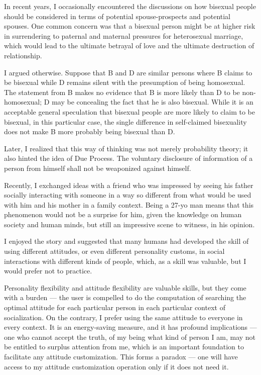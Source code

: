 
\begin{multicols*}{2}
	In recent years, I occasionally encountered the discussions on how bisexual people should be considered
	in terms of potential spouse-prospects and potential spouses.
	One common concern was that a bisexual person might be at higher risk in
	surrendering to paternal and maternal pressures for heterosexual marriage,
    which would lead to the ultimate betrayal of love and the ultimate destruction of relationship.

	I argued otherwise.
	Suppose that B and D are similar persons where B claims to be bisexual while D remains silent with the presumption of being homosexual.
	The statement from B makes no evidence that B is more likely than D to be non-homosexual;
	D may be concealing the fact that he is also bisexual.
	While it is an acceptable general speculation that bisexual people are more likely to claim to be bisexual,
	in this particular case, the single difference in self-claimed bisexuality does not make B more probably being bisexual than D.

	Later, I realized that this way of thinking was not merely probability theory; it also hinted the idea of Due Process.
	The voluntary disclosure of information of a person from himself shall not be weaponized against himself.

	Recently, I exchanged ideas with a friend who was impressed by seeing his father socially interacting with someone
    in a way so different from what would be used with him and his mother in a family context.
    Being a 27-yo man means that this phenomenon would not be a surprise for him,
    given the knowledge on human society and human minds, but still an impressive scene to witness, in his opinion.

    I enjoyed the story and suggested that many humans had developed the skill of using different attitudes,
    or even different personality customs, in social interactions with different kinds of people,
    which, as a skill was valuable, but I would prefer not to practice.

    Personality flexibility and attitude flexibility are valuable skills, but they come with a burden ---
    the user is compelled to do the computation of searching the optimal attitude
    for each particular person in each particular context of socialization.
    On the contrary, I prefer using the same attitude to everyone in every context.
    It is an energy-saving measure, and it has profound implications ---
    one who cannot accept the truth, of my being what kind of person I am, may not be entitled to surplus attention from me,
    which is an important foundation to facilitate any attitude customization.
    This forms a paradox --- one will have access to my attitude customization operation only if it does not need it.


\end{multicols*}
